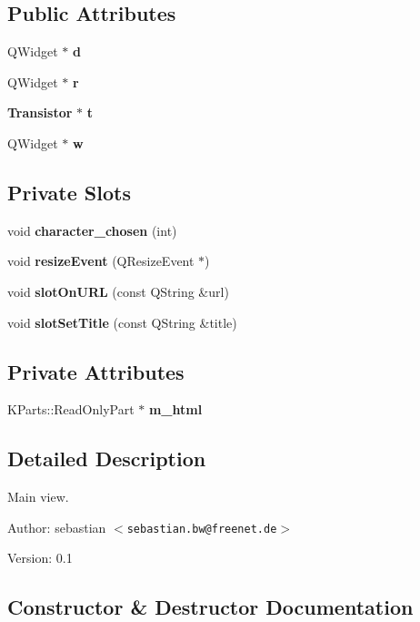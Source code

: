 \subsection*{Public Attributes}
\begin{CompactItemize}
\item 
QWidget $\ast$ {\bf d}
\item 
QWidget $\ast$ {\bf r}
\item 
{\bf Transistor} $\ast$ {\bf t}
\item 
QWidget $\ast$ {\bf w}
\end{CompactItemize}
\subsection*{Private Slots}
\begin{CompactItemize}
\item 
void {\bf character\_\-chosen} (int)
\item 
void {\bf resize\-Event} (QResize\-Event $\ast$)
\item 
void {\bf slot\-On\-URL} (const QString \&url)
\item 
void {\bf slot\-Set\-Title} (const QString \&title)
\end{CompactItemize}
\subsection*{Private Attributes}
\begin{CompactItemize}
\item 
KParts::Read\-Only\-Part $\ast$ {\bf m\_\-html}
\end{CompactItemize}


\subsection{Detailed Description}
Main view. 

\begin{Desc}
\item[Author:]sebastian $<${\tt sebastian.bw@freenet.de}$>$ \end{Desc}
\begin{Desc}
\item[Version:]0.1 \end{Desc}




\subsection{Constructor \& Destructor Documentation}
